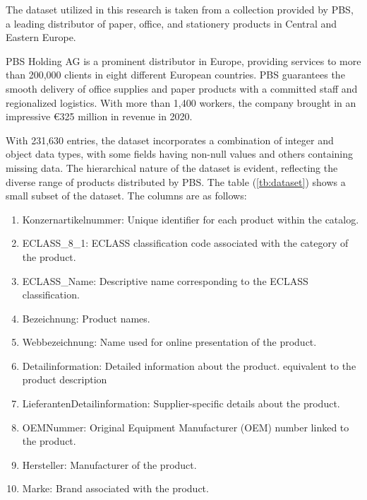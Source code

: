 The dataset utilized in this research is taken from a collection provided by PBS, a leading distributor of paper, office, and stationery products in Central and Eastern Europe. 

PBS Holding AG is a prominent distributor in Europe, providing services to more than 200,000 clients in eight different European countries. PBS guarantees the smooth delivery of office supplies and paper products with a committed staff and regionalized logistics. With more than 1,400 workers, the company brought in an impressive €325 million in revenue in 2020.

With 231,630 entries, the dataset incorporates a combination of integer and object data types, with some fields having non-null values and others containing missing data. The hierarchical nature of the dataset is evident, reflecting the diverse range of products distributed by PBS. The table (\autoref{tb:dataset}) shows a small subset of the dataset. The columns are as follows:


\begin{enumerate}
	\item Konzernartikelnummer: Unique identifier for each product within the catalog.
	\item ECLASS\_8\_1: ECLASS classification code associated with the category of the product.
	\item ECLASS\_Name: Descriptive name corresponding to the ECLASS classification.
	\item Bezeichnung: Product names.
	\item Webbezeichnung: Name used for online presentation of the product.
	\item Detailinformation: Detailed information about the product. equivalent to the product description
	\item LieferantenDetailinformation: Supplier-specific details about the product.
	\item OEMNummer: Original Equipment Manufacturer (OEM) number linked to the product.
	\item Hersteller: Manufacturer of the product.
	\item Marke: Brand associated with the product.
\end{enumerate}


	
	
